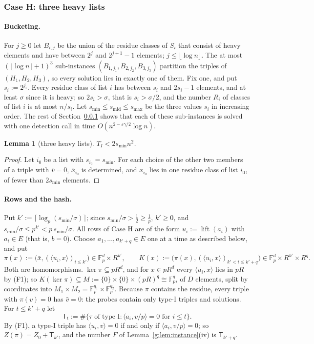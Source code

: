 \documentclass[11pt]{article}
\newtheorem{lemma}[theorem]{Lemma}
\theoremstyle{definition}
\theoremstyle{remark}
\newcommand{\Fp}{\mathbb{F}_p}
\newcommand{\eps}{\varepsilon}
\DeclareMathOperator{\lift}{lift}
\begin{document}
\subsubsection{Case H: three heavy lists}\label{g:sec:G:H}

\paragraph{Bucketing.} For $j\ge0$ let $B_{i,j}$ be the union of the residue classes of $S_i$ that consist of heavy elements and have between $2^j$ and $2^{j+1}-1$ elements; $j\le\lfloor\log n\rfloor$. The at most $(\lfloor\log n\rfloor+1)^3$ sub-instances $(B_{1,j_1},B_{2,j_2},B_{3,j_3})$ partition the triples of $(H_1,H_2,H_3)$, so every solution lies in exactly one of them. Fix one, and put $s_i:=2^{j_i}$. Every residue class of list $i$ has between $s_i$ and $2s_i-1$ elements, and at least $\sigma$ since it is heavy; so $2s_i>\sigma$, that is $s_i>\sigma/2$, and the number $R_i$ of classes of list $i$ is at most $n/s_i$. Let $s_{\min}\le s_{\mathrm{mid}}\le s_{\max}$ be the three values $s_i$ in increasing order. The rest of Section~\ref{g:sec:G:H} shows that each of these sub-instances is solved with one detection call in time $O(n^{2-\eps\gamma/2}\log n)$.

\begin{lemma}[three heavy lists]\label{g:lem:heavyTI}
$T_I<2s_{\min}n^2$.
\end{lemma}
\begin{proof}
Let $i_0$ be a list with $s_{i_0}=s_{\min}$. For each choice of the other two members of a triple with $\bar v=0$, $\bar x_{i_0}$ is determined, and $x_{i_0}$ lies in one residue class of list $i_0$, of fewer than $2s_{\min}$ elements.
\end{proof}

\paragraph{Rows and the hash.} Put $k':=\lceil\log_p(s_{\min}/\sigma)\rceil$; since $s_{\min}/\sigma>\frac12\ge\frac1p$, $k'\ge0$, and $s_{\min}/\sigma\le p^{k'}<p\,s_{\min}/\sigma$. All rows of Case H are of the form $u_i:=\lift(a_i)$ with $a_i\in E$ (that is, $b=0$). Choose $a_1,\dots,a_{k'+q}\in E$ one at a time as described below, and put
\[
\pi(x):=\bigl(\bar x,(\langle u_i,x\rangle)_{i\le k'}\bigr)\in\Fp^d\times R^{k'},\qquad K(x):=\bigl(\pi(x),(\langle u_i,x\rangle)_{k'<i\le k'+q}\bigr)\in\Fp^d\times R^{k'}\times R^q .
\]
Both are homomorphisms. $\ker\pi\subseteq pR^d$, and for $x\in pR^d$ every $\langle u_i,x\rangle$ lies in $pR$ by (F1); so $K(\ker\pi)\subseteq M:=\{0\}\times\{0\}\times(pR)^q\cong\Fp^q$, of $D$ elements, split by coordinates into $M_1\times M_2=\Fp^{q_1}\times\Fp^{q_2}$. Because $\pi$ contains the residue, every triple with $\pi(v)=0$ has $\bar v=0$: the probes contain only type-I triples and solutions. For $t\le k'+q$ let
\[
\mathsf T_t:=\#\{\tau\text{ of type I}:\langle a_i,v/p\rangle=0\text{ for }i\le t\}.
\]
By (F1), a type-I triple has $\langle u_i,v\rangle=0$ if and only if $\langle a_i,v/p\rangle=0$; so $Z(\pi)=Z_0+\mathsf T_{k'}$, and the number $F$ of Lemma~\ref{g:lem:instance}(iv) is $\mathsf T_{k'+q}$.
\end{document}
